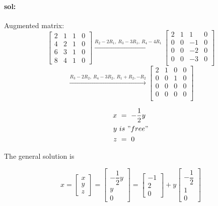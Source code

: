 \documentclass{article}
\begin{document}
	\paragraph{sol:}
		Augmented matrix:
	\[
	\left[
		\begin{array}{lll|l}
			2 & 1 & 1 & 0\\
			4 & 2 & 1 & 0\\
			6 & 3 & 1 & 0\\
			8 & 4 & 1 & 0
		\end{array}
	\right]
	\xrightarrow{R_2-2R_1,\ R_3-3R_1,\ R_4-4R_1}
	\left[
		\begin{array}{ccc|c}
			2 & 1 & 1 & 0\\
			0 & 0 & -1 & 0\\
			0 & 0 & -2 & 0\\
			0 & 0 & -3 & 0\\
		\end{array}
	\right]	
	\]
	\[
	\xrightarrow{R_3-2R_2,\ R_4-3R_2,\ R_1+R_2, -R_2}
	\left[
		\begin{array}{ccc|c}
			2 & 1 & 0 & 0\\
			0 & 0 & 1 & 0\\
			0 & 0 & 0 & 0\\
			0 & 0 & 0 & 0\\
		\end{array}
	\right]
	\]
		
	\begin{align*}
		x\ &= \ -\dfrac{1}{2}y\\
		y\ &is \ "free"\\
		z\ &= \ 0	
	\end{align*}
		
	The general solution is
		
	\[
	x=
	\left[
		\begin{array}{c}
			x\\
			y\\
			z
		\end{array}
	\right]
		=
	\left[
		\begin{array}{c}
			-\dfrac{1}{2}y\\
			y\\
			0
		\end{array}
	\right]
	=
	\left[
		\begin{array}{c}
			-1\\
			2\\
			0
		\end{array}
	\right]
	+y
	\left[
		\begin{array}{c}
			-\dfrac{1}{2}\\
			1\\
			0
		\end{array}
	\right]
	\]
		
\end{document}
